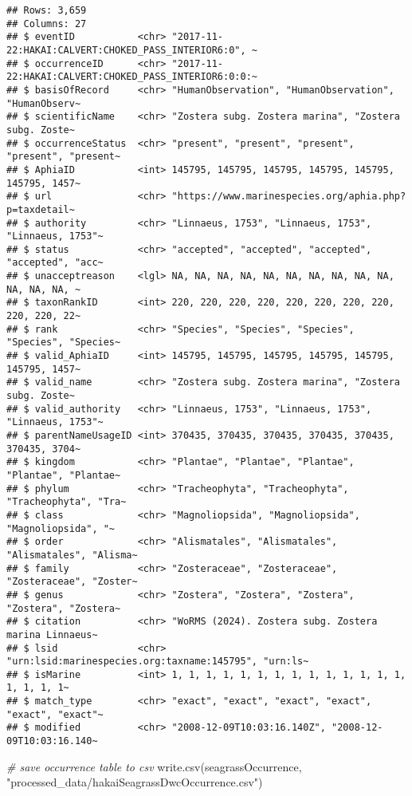 \documentclass[
]{book}
\newenvironment{Shaded}{\begin{snugshade}}{\end{snugshade}}
\newcommand{\CommentTok}[1]{\textcolor[rgb]{0.56,0.35,0.01}{\textit{#1}}}
\newcommand{\FunctionTok}[1]{\textcolor[rgb]{0.00,0.00,0.00}{#1}}
\newcommand{\NormalTok}[1]{#1}
\newcommand{\StringTok}[1]{\textcolor[rgb]{0.31,0.60,0.02}{#1}}
\begin{document}
\begin{verbatim}
## Rows: 3,659
## Columns: 27
## $ eventID           <chr> "2017-11-22:HAKAI:CALVERT:CHOKED_PASS_INTERIOR6:0", ~
## $ occurrenceID      <chr> "2017-11-22:HAKAI:CALVERT:CHOKED_PASS_INTERIOR6:0:0:~
## $ basisOfRecord     <chr> "HumanObservation", "HumanObservation", "HumanObserv~
## $ scientificName    <chr> "Zostera subg. Zostera marina", "Zostera subg. Zoste~
## $ occurrenceStatus  <chr> "present", "present", "present", "present", "present~
## $ AphiaID           <int> 145795, 145795, 145795, 145795, 145795, 145795, 1457~
## $ url               <chr> "https://www.marinespecies.org/aphia.php?p=taxdetail~
## $ authority         <chr> "Linnaeus, 1753", "Linnaeus, 1753", "Linnaeus, 1753"~
## $ status            <chr> "accepted", "accepted", "accepted", "accepted", "acc~
## $ unacceptreason    <lgl> NA, NA, NA, NA, NA, NA, NA, NA, NA, NA, NA, NA, NA, ~
## $ taxonRankID       <int> 220, 220, 220, 220, 220, 220, 220, 220, 220, 220, 22~
## $ rank              <chr> "Species", "Species", "Species", "Species", "Species~
## $ valid_AphiaID     <int> 145795, 145795, 145795, 145795, 145795, 145795, 1457~
## $ valid_name        <chr> "Zostera subg. Zostera marina", "Zostera subg. Zoste~
## $ valid_authority   <chr> "Linnaeus, 1753", "Linnaeus, 1753", "Linnaeus, 1753"~
## $ parentNameUsageID <int> 370435, 370435, 370435, 370435, 370435, 370435, 3704~
## $ kingdom           <chr> "Plantae", "Plantae", "Plantae", "Plantae", "Plantae~
## $ phylum            <chr> "Tracheophyta", "Tracheophyta", "Tracheophyta", "Tra~
## $ class             <chr> "Magnoliopsida", "Magnoliopsida", "Magnoliopsida", "~
## $ order             <chr> "Alismatales", "Alismatales", "Alismatales", "Alisma~
## $ family            <chr> "Zosteraceae", "Zosteraceae", "Zosteraceae", "Zoster~
## $ genus             <chr> "Zostera", "Zostera", "Zostera", "Zostera", "Zostera~
## $ citation          <chr> "WoRMS (2024). Zostera subg. Zostera marina Linnaeus~
## $ lsid              <chr> "urn:lsid:marinespecies.org:taxname:145795", "urn:ls~
## $ isMarine          <int> 1, 1, 1, 1, 1, 1, 1, 1, 1, 1, 1, 1, 1, 1, 1, 1, 1, 1~
## $ match_type        <chr> "exact", "exact", "exact", "exact", "exact", "exact"~
## $ modified          <chr> "2008-12-09T10:03:16.140Z", "2008-12-09T10:03:16.140~
\end{verbatim}

\begin{Shaded}
\begin{Highlighting}[]
\CommentTok{\# save occurrence table to csv}
\FunctionTok{write.csv}\NormalTok{(seagrassOccurrence, }\StringTok{"processed\_data/hakaiSeagrassDwcOccurrence.csv"}\NormalTok{)}
\end{Highlighting}
\end{Shaded}
\end{document}
